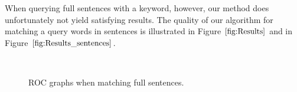 \documentclass[conference]{IEEEtran}
\begin{document}
When querying full sentences with a keyword, however, 
our method does unfortunately not yield satisfying results. The quality of our algorithm for matching a query words in sentences is illustrated in Figure $\ref{fig:Results}$ and in Figure $\ref{fig:Results_sentences}$.
\begin{figure}[ht!]%
\centering
{}
\\
\caption{ROC graphs when matching full sentences.}
\label{fig:Results}
\end{figure}
\end{document}
